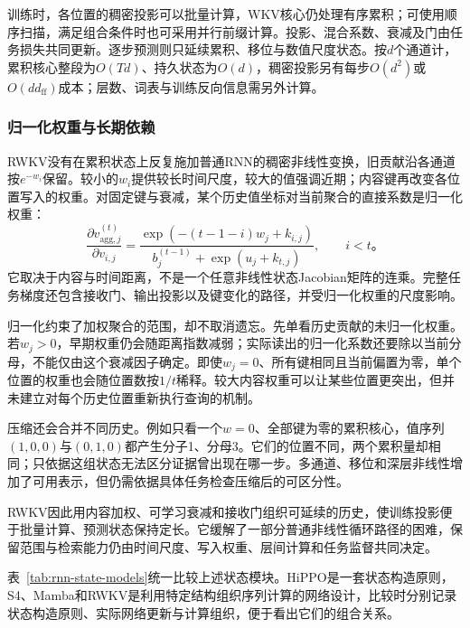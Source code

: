 训练时，各位置的稠密投影可以批量计算，WKV核心仍处理有序累积；可使用顺序扫描，满足组合条件时也可采用并行前缀计算。投影、混合系数、衰减及门由任务损失共同更新。逐步预测则只延续累积、移位与数值尺度状态。按$d$个通道计，累积核心整段为$O(Td)$、持久状态为$O(d)$，稠密投影另有每步$O(d^2)$或$O(dd_{\mathrm{ff}})$成本；层数、词表与训练反向信息需另外计算。

\subsubsection{归一化权重与长期依赖}
\label{sec:rnn-rwkv-long-memory}

RWKV没有在累积状态上反复施加普通RNN的稠密非线性变换，旧贡献沿各通道按$e^{-w_i}$保留。较小的$w_i$提供较长时间尺度，较大的值强调近期；内容键再改变各位置写入的权重。对固定键与衰减，某个历史值坐标对当前聚合的直接系数是归一化权重：
\begin{equation}
  \frac{\partial v_{\mathrm{agg},j}^{(t)}}{\partial v_{i,j}}
     =\frac{\exp(-(t-1-i)w_j+k_{i,j})}
       {b_j^{(t-1)}+\exp(u_j+k_{t,j})},\qquad i<t\text{。}
  \label{eq:rnn-rwkv-value-gradient}
\end{equation}
它取决于内容与时间距离，不是一个任意非线性状态Jacobian矩阵的连乘。完整任务梯度还包含接收门、输出投影以及键变化的路径，并受归一化权重的尺度影响。

归一化约束了加权聚合的范围，却不取消遗忘。先单看历史贡献的未归一化权重。若$w_j>0$，早期权重仍会随距离指数减弱；实际读出的归一化系数还要除以当前分母，不能仅由这个衰减因子确定。即使$w_j=0$、所有键相同且当前偏置为零，单个位置的权重也会随位置数按$1/t$稀释。较大内容权重可以让某些位置更突出，但并未建立对每个历史位置重新执行查询的机制。

压缩还会合并不同历史。例如只看一个$w=0$、全部键为零的累积核心，值序列$(1,0,0)$与$(0,1,0)$都产生分子1、分母3。它们的位置不同，两个累积量却相同；只依据这组状态无法区分证据曾出现在哪一步。多通道、移位和深层非线性增加了可用表示，但仍需依据具体任务检查压缩后的可区分性。

RWKV因此用内容加权、可学习衰减和接收门组织可延续的历史，使训练投影便于批量计算、预测状态保持定长。它缓解了一部分普通非线性循环路径的困难，保留范围与检索能力仍由时间尺度、写入权重、层间计算和任务监督共同决定。

表~\ref{tab:rnn-state-models}统一比较上述状态模块。HiPPO是一套状态构造原则，S4、Mamba和RWKV是利用特定结构组织序列计算的网络设计，比较时分别记录状态构造原则、实际网络更新与计算组织，便于看出它们的组合关系。

